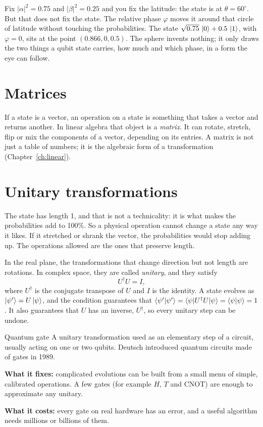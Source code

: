 Fix $|\alpha|^2 = 0.75$ and $|\beta|^2 = 0.25$ and you fix the latitude: the
state is at $\theta = 60^\circ$. But that does not fix the state. The relative
phase $\varphi$ moves it around that circle of latitude without touching the
probabilities. The state
$\sqrt{0.75}\,\ket{0} + 0.5\,\ket{1}$, with $\varphi = 0$, sits at the point
$(0.866, 0, 0.5)$. The sphere invents nothing; it only draws the two things a
qubit state carries, how much and which phase, in a form the eye can follow.

\section{Matrices}

If a state is a vector, an operation on a state is something that takes a vector
and returns another. In linear algebra that object is a \emph{matrix}. It can
rotate, stretch, flip or mix the components of a vector, depending on its
entries. A matrix is not just a table of numbers; it is the algebraic form of a
transformation (Chapter~\ref{ch:linear}).

\section{Unitary transformations}

The state has length 1, and that is not a technicality: it is what makes the
probabilities add to 100\%. So a physical operation cannot change a state any way
it likes. If it stretched or shrank the vector, the probabilities would stop
adding up. The operations allowed are the ones that preserve length.

In the real plane, the transformations that change direction but not length are
rotations. In complex space, they are called \emph{unitary}, and they satisfy
\[
  U^\dagger U = I ,
\]
where $U^\dagger$ is the conjugate transpose of $U$ and $I$ is the identity. A
state evolves as $\ket{\psi'} = U\ket{\psi}$, and the condition guarantees that
$\braket{\psi'|\psi'} = \braket{\psi|U^\dagger U|\psi} = \braket{\psi|\psi} = 1$.
It also guarantees that $U$ has an inverse, $U^\dagger$, so every unitary step can
be undone.

\begin{concept}{Quantum gate}
A unitary transformation used as an elementary step of a circuit, usually acting
on one or two qubits. Deutsch introduced quantum circuits made of gates in 1989.

\textbf{What it fixes:} complicated evolutions can be built from a small menu of
simple, calibrated operations. A few gates (for example $H$, $T$ and CNOT) are
enough to approximate any unitary.

\textbf{What it costs:} every gate on real hardware has an error, and a useful
algorithm needs millions or billions of them.
\end{concept}

